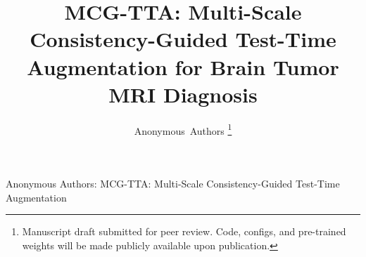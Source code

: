 \documentclass[journal]{IEEEtran}
\begin{document}
\title{MCG-TTA: Multi-Scale Consistency-Guided Test-Time Augmentation for Brain Tumor MRI Diagnosis}

\author{Anonymous~Authors%
\thanks{Manuscript draft submitted for peer review. Code, configs, and pre-trained weights will be made publicly available upon publication.}}

%
{Anonymous Authors: MCG-TTA: Multi-Scale Consistency-Guided Test-Time Augmentation}

\maketitle


\IEEEpeerreviewmaketitle








\end{document}
